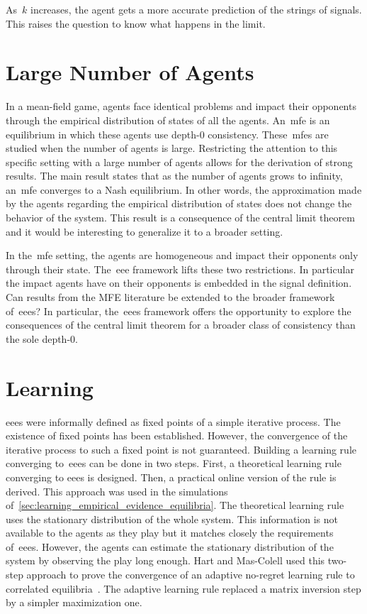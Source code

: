 As~\(k\) increases, the agent gets a more accurate prediction of the strings of signals.
This raises the question to know what happens in the limit.

\section{Large Number of Agents}
In a mean-field game, agents face identical problems and impact their opponents through the empirical distribution of states of all the agents.
An~\ac{mfe} is an equilibrium in which these agents use depth-\(0\) consistency.
These~\acp{mfe} are studied when the number of agents is large.
Restricting the attention to this specific setting with a large number of agents allows for the derivation of strong results.
The main result states that as the number of agents grows to infinity, an~\ac{mfe} converges to a Nash equilibrium.
In other words, the approximation made by the agents regarding the empirical distribution of states does not change the behavior of the system.
This result is a consequence of the central limit theorem and it would be interesting to generalize it to a broader setting.

In the~\ac{mfe} setting, the agents are homogeneous and impact their opponents only through their state.
The~\ac{eee} framework lifts these two restrictions.
In particular the impact agents have on their opponents is embedded in the signal definition.
Can results from the MFE literature be extended to the broader framework of~\acp{eee}?
In particular, the~\acp{eee} framework offers the opportunity to explore the consequences of the central limit theorem for a broader class of consistency than the sole depth-\(0\).

\section{Learning}
\Acp{eee} were informally defined as fixed points of a simple iterative process.
The existence of fixed points has been established.
However, the convergence of the iterative process to such a fixed point is not guaranteed.
Building a learning rule converging to~\acp{eee} can be done in two steps.
First, a theoretical learning rule converging to \acp{eee} is designed.
Then, a practical online version of the rule is derived.
This approach was used in the simulations of~\cref{sec:learning_empirical_evidence_equilibria}.
The theoretical learning rule uses the stationary distribution of the whole system.
This information is not available to the agents as they play but it matches closely the requirements of~\acp{eee}.
However, the agents can estimate the stationary distribution of the system by observing the play long enough.
Hart and Mas-Colell used this two-step approach to prove the convergence of an adaptive no-regret learning rule to correlated equilibria~\cite{hart_mas-colell:2001}.
The adaptive learning rule replaced a matrix inversion step by a simpler maximization one.

